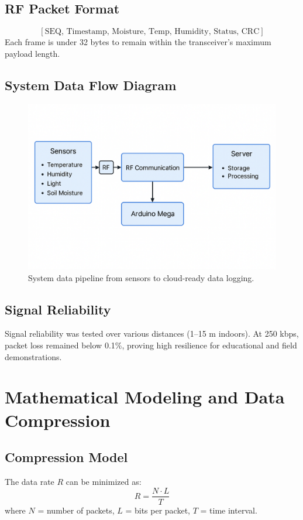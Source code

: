\documentclass[12pt,a4paper]{article}
\begin{document}
\subsection{RF Packet Format}
\[
[\text{SEQ, Timestamp, Moisture, Temp, Humidity, Status, CRC}]
\]
Each frame is under 32 bytes to remain within the transceiver’s maximum payload length.

\subsection{System Data Flow Diagram}
\begin{figure}[H]\centering
\includegraphics[width=0.9\linewidth]{figs/data_pipeline.png}
\caption{System data pipeline from sensors to cloud-ready data logging.}
\end{figure}

\subsection{Signal Reliability}
Signal reliability was tested over various distances (1–15 m indoors). At 250 kbps, packet loss remained below 0.1\%, proving high resilience for educational and field demonstrations.

\clearpage
\section{Mathematical Modeling and Data Compression}

\subsection{Compression Model}
The data rate \( R \) can be minimized as:
\[
R = \frac{N \cdot L}{T}
\]
where \(N\) = number of packets, \(L\) = bits per packet, \(T\) = time interval. 
\end{document}
